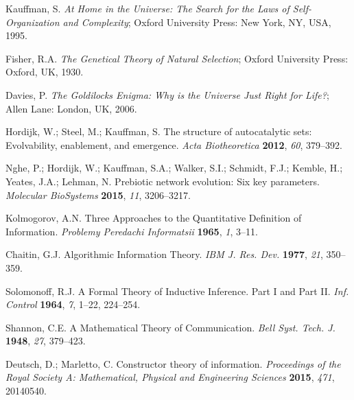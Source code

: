 \documentclass[preprint,12pt]{elsarticle}
\begin{document}
%

\begin{thebibliography}{999}

Kauffman, S. \textit{At Home in the Universe: The Search for the Laws of Self-Organization and Complexity}; Oxford University Press: New York, NY, USA, 1995.

Fisher, R.A. \textit{The Genetical Theory of Natural Selection}; Oxford University Press: Oxford, UK, 1930.

Davies, P. \textit{The Goldilocks Enigma: Why is the Universe Just Right for Life?}; Allen Lane: London, UK, 2006.

Hordijk, W.; Steel, M.; Kauffman, S. The structure of autocatalytic sets: Evolvability, enablement, and emergence. \textit{Acta Biotheoretica} \textbf{2012}, \textit{60}, 379–392.

Nghe, P.; Hordijk, W.; Kauffman, S.A.; Walker, S.I.; Schmidt, F.J.; Kemble, H.; Yeates, J.A.; Lehman, N. Prebiotic network evolution: Six key parameters. \textit{Molecular BioSystems} \textbf{2015}, \textit{11}, 3206–3217.

Kolmogorov, A.N. Three Approaches to the Quantitative Definition of Information. \textit{Problemy Peredachi Informatsii} \textbf{1965}, \textit{1}, 3–11.

Chaitin, G.J. Algorithmic Information Theory. \textit{IBM J. Res. Dev.} \textbf{1977}, \textit{21}, 350–359.

Solomonoff, R.J. A Formal Theory of Inductive Inference. Part I and Part II. \textit{Inf. Control} \textbf{1964}, \textit{7}, 1–22, 224–254.

Shannon, C.E. A Mathematical Theory of Communication. \textit{Bell Syst. Tech. J.} \textbf{1948}, \textit{27}, 379–423.

Deutsch, D.; Marletto, C. Constructor theory of information. \textit{Proceedings of the Royal Society A: Mathematical, Physical and Engineering Sciences} \textbf{2015}, \textit{471}, 20140540.


\end{thebibliography}
\end{document}
